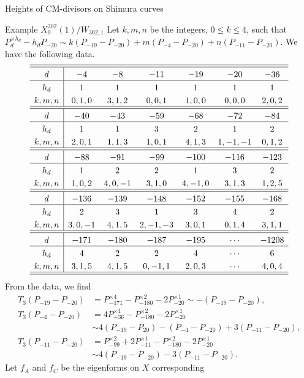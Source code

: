 \documentclass{amsart}
\theoremstyle{definition}
\begin{document}
\begin{section}{Heights of CM-divisors on Shimura curves}
\begin{subsection}{Example $X_0^{302}(1)/W_{302,1}$}
Let $k,m,n$
be the integers, $0\le k\le 4$, such that $P_d^{\times
  h_d}-h_dP_{-20}\sim
k(P_{-19}-P_{-20})+m(P_{-4}-P_{-20})+n(P_{-11}-P_{-20})$.
We have the following data.
$$ \extrarowheight3pt
\begin{array}{c|cccccc} \hline\hline
 d & -4 & -8 & -11 & -19 & -20 & -36 \\ \hline
h_d&  1 &  1 &  1  &  1  &  1  &  1  \\
k,m,n&0,1,0&3,1,2&0,0,1&1,0,0&0,0,0&2,0,2
\\ \hline\hline
 d & -40 & -43 & -59 & -68 & -72 & -84 \\ \hline
h_d&  1  &  1  &  3  &  2  &  1  &  2  \\
k,m,n&2,0,1&1,1,3&1,0,1&4,1,3&1,-1,-1&0,1,2
\\ \hline\hline
 d & -88 & -91 & -99 & -100 & -116 & -123 \\ \hline
h_d&  1  &  2  &  2  &   1  &   3  &   2  \\
k,m,n&1,0,2&4,0,-1&3,1,0&4,-1,0&3,1,3&1,2,5
\\ \hline\hline
 d & -136 & -139 & -148 & -152 & -155 & -168 \\ \hline
h_d&   2  &   3  &   1  &   3  &   4  &   2  \\
k,m,n&3,0,-1&4,1,5&2,-1,-3&3,0,1&0,1,4&3,1,1
\\ \hline\hline
 d & -171 & -180 & -187 & -195 & \cdots & -1208 \\ \hline
h_d&   4  &   2  &   2  &   4  & \cdots &   6  \\ 
k,m,n&3,1,5&4,1,5&0,-1,1&2,0,3&\cdots&4,0,4
\\ \hline\hline
\end{array}
$$
From the data, we find
\begin{equation*}
\begin{split}
  T_3(P_{-19}-P_{-20})&=P_{-171}^{\times 4}
    -P_{-180}^{\times 2}-2P_{-20}^{\times 1}\sim-(P_{-19}-P_{-20}), \\
  T_3(P_{-4}-P_{-20})&=4P_{-36}^{\times 1}
    -P_{-180}^{\times 2}-2P_{-20}^{\times 1} \\
  &\sim 4(P_{-19}-P_{20})-(P_{-4}-P_{-20})+3(P_{-11}-P_{-20}), \\
  T_3(P_{-11}-P_{-20})&=P_{-99}^{\times 2}
    +2P_{-11}^{\times 1}-P_{-180}^{\times 2}-2P_{-20}^{\times 1} \\
  &\sim 4(P_{-19}-P_{-20})-3(P_{-11}-P_{-20}).
\end{split}
\end{equation*}
Let $f_A$ and $f_C$ be the eigenforms on $X$ corresponding

\end{subsection}
\end{section}
\end{document}
